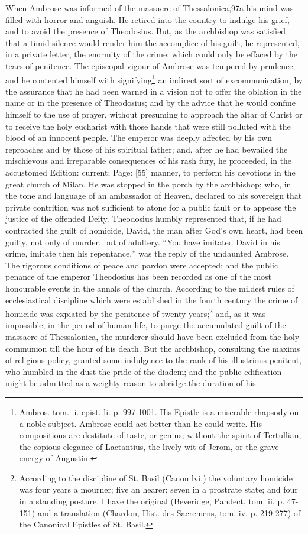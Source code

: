 When Ambrose was informed of the massacre of Thessalonica,97a his mind was filled with horror and anguish. He retired into the country to indulge his grief, and to avoid the presence of Theodosius. But, as the archbishop was satisfied that a timid silence would render him the accomplice of his guilt, he represented, in a private letter, the enormity of the crime; which could only be effaced by the tears of penitence. The episcopal vigour of Ambrose was tempered by prudence; and he contented himself with signifying\footnote{Ambros. tom. ii. epist. li. p. 997-1001. His Epistle is a miserable rhapsody on a noble subject. Ambrose could act better than he could write. His compositions are destitute of taste, or genius; without the spirit of Tertullian, the copious elegance of Lactantius, the lively wit of Jerom, or the grave energy of Augustin.} an indirect sort of excommunication, by the assurance that he had been warned in a vision not to offer the oblation in the name or in the presence of Theodosius; and by the advice that he would confine himself to the use of prayer, without presuming to approach the altar of Christ or to receive the holy eucharist with those hands that were still polluted with the blood of an innocent people. The emperor was deeply affected by his own reproaches and by those of his spiritual father; and, after he had bewailed the mischievous and irreparable consequences of his rash fury, he proceeded, in the accustomed Edition: current; Page: [55] manner, to perform his devotions in the great church of Milan. He was stopped in the porch by the archbishop; who, in the tone and language of an ambassador of Heaven, declared to his sovereign that private contrition was not sufficient to atone for a public fault or to appease the justice of the offended Deity. Theodosius humbly represented that, if he had contracted the guilt of homicide, David, the man after God\texthebrew{}’s own heart, had been guilty, not only of murder, but of adultery. \texthebrew{“}You have imitated David in his crime, imitate then his repentance,\texthebrew{}” was the reply of the undaunted Ambrose. The rigorous conditions of peace and pardon were accepted; and the public penance of the emperor Theodosius has been recorded as one of the most honourable events in the annals of the church. According to the mildest rules of ecclesiastical discipline which were established in the fourth century the crime of homicide was expiated by the penitence of twenty years;\footnote{According to the discipline of St. Basil (Canon lvi.) the voluntary homicide was four years a mourner; five an hearer; seven in a prostrate state; and four in a standing posture. I have the original (Beveridge, Pandect. tom. ii. p. 47-151) and a translation (Chardon, Hist. des Sacremens, tom. iv. p. 219-277) of the Canonical Epistles of St. Basil.} and, as it was impossible, in the period of human life, to purge the accumulated guilt of the massacre of Thessalonica, the murderer should have been excluded from the holy communion till the hour of his death. But the archbishop, consulting the maxims of religious policy, granted some indulgence to the rank of his illustrious penitent, who humbled in the dust the pride of the diadem; and the public edification might be admitted as a weighty reason to abridge the duration of his 
